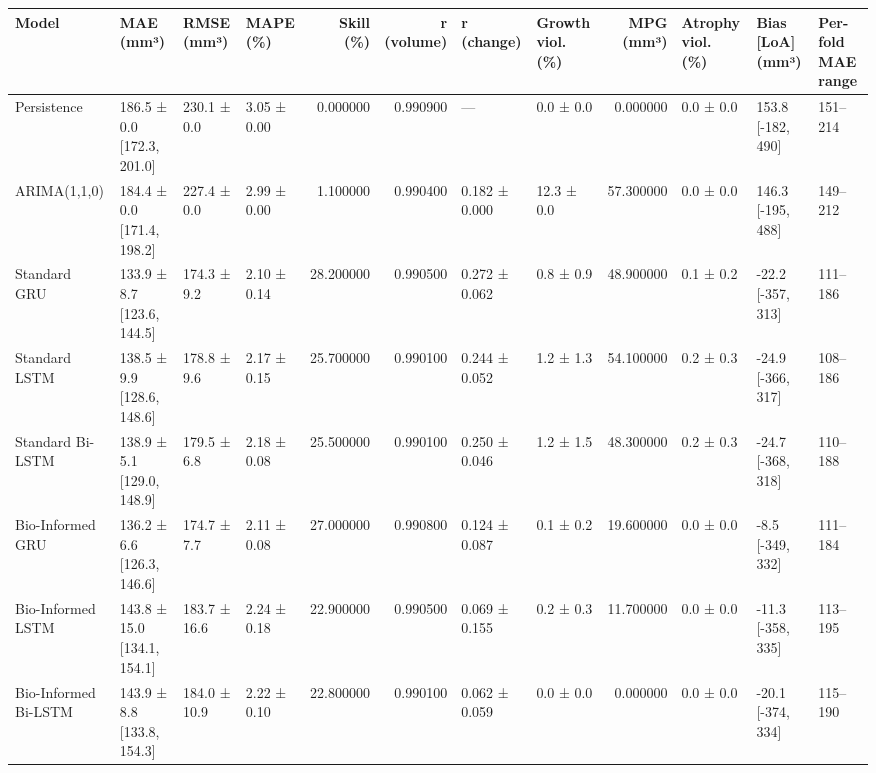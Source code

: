 \begin{tabular}{llllrrllrlll}
\toprule
Model & MAE (mm³) & RMSE (mm³) & MAPE (\%) & Skill (\%) & r (volume) & r (change) & Growth viol. (\%) & MPG (mm³) & Atrophy viol. (\%) & Bias [LoA] (mm³) & Per-fold MAE range \\
\midrule
Persistence & 186.5 ± 0.0 [172.3, 201.0] & 230.1 ± 0.0 & 3.05 ± 0.00 & 0.000000 & 0.990900 & — & 0.0 ± 0.0 & 0.000000 & 0.0 ± 0.0 & 153.8 [-182, 490] & 151–214 \\
ARIMA(1,1,0) & 184.4 ± 0.0 [171.4, 198.2] & 227.4 ± 0.0 & 2.99 ± 0.00 & 1.100000 & 0.990400 & 0.182 ± 0.000 & 12.3 ± 0.0 & 57.300000 & 0.0 ± 0.0 & 146.3 [-195, 488] & 149–212 \\
Standard GRU & 133.9 ± 8.7 [123.6, 144.5] & 174.3 ± 9.2 & 2.10 ± 0.14 & 28.200000 & 0.990500 & 0.272 ± 0.062 & 0.8 ± 0.9 & 48.900000 & 0.1 ± 0.2 & -22.2 [-357, 313] & 111–186 \\
Standard LSTM & 138.5 ± 9.9 [128.6, 148.6] & 178.8 ± 9.6 & 2.17 ± 0.15 & 25.700000 & 0.990100 & 0.244 ± 0.052 & 1.2 ± 1.3 & 54.100000 & 0.2 ± 0.3 & -24.9 [-366, 317] & 108–186 \\
Standard Bi-LSTM & 138.9 ± 5.1 [129.0, 148.9] & 179.5 ± 6.8 & 2.18 ± 0.08 & 25.500000 & 0.990100 & 0.250 ± 0.046 & 1.2 ± 1.5 & 48.300000 & 0.2 ± 0.3 & -24.7 [-368, 318] & 110–188 \\
Bio-Informed GRU & 136.2 ± 6.6 [126.3, 146.6] & 174.7 ± 7.7 & 2.11 ± 0.08 & 27.000000 & 0.990800 & 0.124 ± 0.087 & 0.1 ± 0.2 & 19.600000 & 0.0 ± 0.0 & -8.5 [-349, 332] & 111–184 \\
Bio-Informed LSTM & 143.8 ± 15.0 [134.1, 154.1] & 183.7 ± 16.6 & 2.24 ± 0.18 & 22.900000 & 0.990500 & 0.069 ± 0.155 & 0.2 ± 0.3 & 11.700000 & 0.0 ± 0.0 & -11.3 [-358, 335] & 113–195 \\
Bio-Informed Bi-LSTM & 143.9 ± 8.8 [133.8, 154.3] & 184.0 ± 10.9 & 2.22 ± 0.10 & 22.800000 & 0.990100 & 0.062 ± 0.059 & 0.0 ± 0.0 & 0.000000 & 0.0 ± 0.0 & -20.1 [-374, 334] & 115–190 \\
\bottomrule
\end{tabular}
